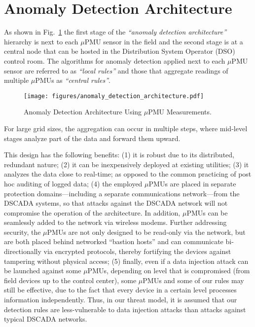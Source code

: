 \documentclass[twocolumn]{IEEEtran}
\newcommand{\mup}{\mu \text{PMU}}
\begin{document}
\section{Anomaly Detection Architecture}
As shown in Fig.~\ref{fig.anomaly_arch} the first stage of the  \textit{``anomaly detection architecture''} hierarchy is next to each $\mup$ sensor in the field and the second stage is at a central node that can be hosted in the Distribution System Operator (DSO) control room. The algorithms for anomaly detection applied next to each $\mup$ sensor are referred to as  
\textit{``local rules''} and those that aggregate readings of multiple $\mup$s as \textit{``central rules''}.         
\begin{figure}[ht]
\centering
\texttt{[image: figures/anomaly\_detection\_architecture.pdf]}
\caption{Anomaly Detection Architecture Using $\mup$ Measurements.}
\label{fig.anomaly_arch}
\end{figure}
For large grid sizes, the aggregation can occur in multiple steps, where mid-level stages analyze part of the data and forward them upward.

This design has the following benefits: (1) it is robust due to its distributed, redundant nature; (2) it can be inexpensively deployed at existing utilities; (3) it analyzes the data close to real-time; as opposed to the common practicing of post hoc auditing of logged data; (4) the employed $\mup$s are placed in separate protection domains---including a separate communications network---from the DSCADA systems, so that attacks against the DSCADA network will not compromise the operation of the architecture. In addition, $\mup$s can be seamlessly added to the network via wireless modems. Further addressing security, the $\mup$s are not only designed to be read-only  via the network, but are both placed behind networked ``bastion hosts'' and can communicate bi-directionally via encrypted protocols, thereby fortifying the devices against tampering without physical access; (5) finally, even if a data injection attack can be launched against some $\mup$s, depending on level that is compromised (from field devices up to the control center), some $\mup$s and some of our rules may still be effective, due to the fact that every device in a certain level processes information independently. Thus, in our threat model, it is assumed that our detection rules are less-vulnerable to data injection attacks than attacks against typical DSCADA networks. 
\end{document}
